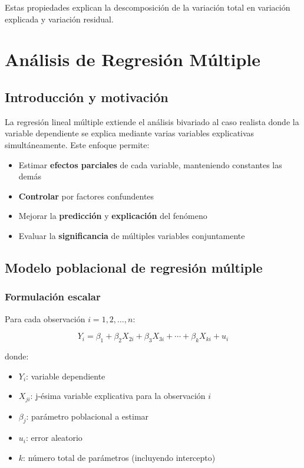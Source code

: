 \documentclass[11pt,a4paper]{article}
\begin{document}
Estas propiedades explican la descomposición de la variación total en variación explicada y variación residual.




\section{Análisis de Regresión Múltiple}
 
\subsection{Introducción y motivación}
 
La regresión lineal múltiple extiende el análisis bivariado al caso realista donde la variable dependiente se explica mediante varias variables explicativas simultáneamente. Este enfoque permite:
 
\begin{itemize}[noitemsep]
    \item Estimar \textbf{efectos parciales} de cada variable, manteniendo constantes las demás
    \item \textbf{Controlar} por factores confundentes
    \item Mejorar la \textbf{predicción} y \textbf{explicación} del fenómeno
    \item Evaluar la \textbf{significancia} de múltiples variables conjuntamente
\end{itemize}
 
\subsection{Modelo poblacional de regresión múltiple}
 
\subsubsection*{Formulación escalar}
 
Para cada observación $i = 1, 2, \ldots, n$:
 
\[
Y_i = \beta_1 + \beta_2 X_{2i} + \beta_3 X_{3i} + \cdots + \beta_k X_{ki} + u_i
\]
 
donde:
\begin{itemize}[noitemsep]
    \item $Y_i$: variable dependiente
    \item $X_{ji}$: j-ésima variable explicativa para la observación $i$
    \item $\beta_j$: parámetro poblacional a estimar
    \item $u_i$: error aleatorio
    \item $k$: número total de parámetros (incluyendo intercepto)
\end{itemize}
 
\end{document}
